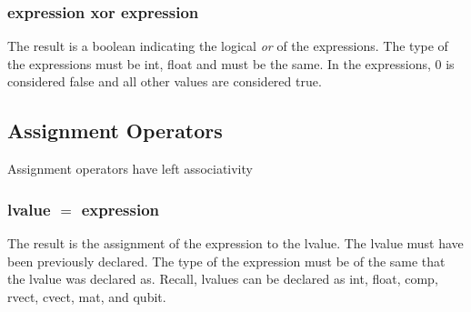 \subsubsection{expression xor expression}
The result is a boolean indicating the logical \textit{or} of the expressions. The type of the expressions must be int, float and must be the same. In the expressions, 0 is considered false and all other values are considered true.
\subsection{Assignment Operators}
Assignment operators have left associativity
\subsubsection{lvalue $=$ expression}
The result is the assignment of the expression to the lvalue. The lvalue must have been previously declared. The type of the expression must be of the same that the lvalue was declared as. Recall, lvalues can be declared as int, float, comp, rvect, cvect, mat, and qubit.